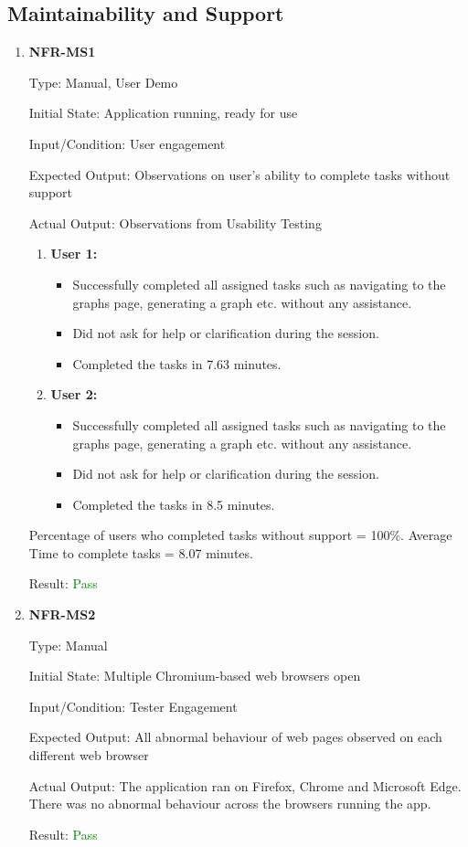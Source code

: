 \documentclass[12pt, titlepage]{article}
\begin{document}
\subsection{Maintainability and Support}
\begin{enumerate}
\item{\textbf{NFR-MS1}} \label{NFR:MS1}

Type: Manual, User Demo

Initial State: Application running, ready for use

Input/Condition: User engagement

Expected Output: Observations on user's ability to complete tasks without
support

Actual Output: \newline
Observations from Usability Testing 
\begin{enumerate}
  \item \textbf{User 1:}
  \begin{itemize}
    \item Successfully completed all assigned tasks such as navigating to the graphs 
    page, generating a graph etc. without any assistance.
    \item Did not ask for help or clarification during the session.
    \item Completed the tasks in 7.63 minutes.
  \end{itemize}
  \item \textbf{User 2:}
  \begin{itemize}
    \item Successfully completed all assigned tasks such as navigating to the graphs 
    page, generating a graph etc. without any assistance.
    \item Did not ask for help or clarification during the session.
    \item Completed the tasks in 8.5 minutes.
  \end{itemize}
\end{enumerate}
Percentage of users who completed tasks without support = 100\%. 
Average Time to complete tasks = 8.07 minutes.

Result: \textcolor{green}{Pass}
					
\item{\textbf{NFR-MS2}} \label{NFR:MS2}

Type: Manual

Initial State: Multiple Chromium-based web browsers open

Input/Condition: Tester Engagement

Expected Output: All abnormal behaviour of web pages observed on each different
web browser

Actual Output: The application ran on Firefox, Chrome and Microsoft Edge. There
was no abnormal behaviour across the browsers running the app. 

Result: \textcolor{green}{Pass}
\end{enumerate}
\end{document}
